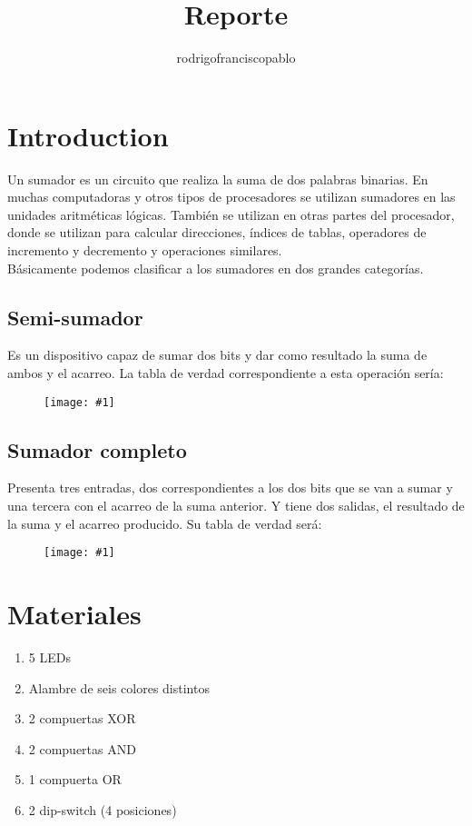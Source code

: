 \documentclass{mylib/reporte}
\title{Reporte}
\author{rodrigofranciscopablo }
\newcommand{\insertImage}[2]{
	\begin{figure}[H]
		\centering
		\texttt{[image: \#1]}
	\end{figure}
}
\begin{document}
\coverPage

\tableofcontents
\newpage

\section{Introduction}

Un sumador es un circuito que realiza la suma de dos palabras binarias.  En muchas computadoras y otros tipos de procesadores se utilizan sumadores en las unidades aritméticas lógicas. También se utilizan en otras partes del procesador, donde se utilizan para calcular direcciones, índices de tablas, operadores de incremento y decremento y operaciones similares.\\

Básicamente podemos clasificar a los sumadores en dos grandes categorías.

\subsection{Semi-sumador}
Es un dispositivo capaz de sumar dos bits y dar como resultado la suma de ambos y el acarreo. La tabla de verdad correspondiente a esta operación sería:

\insertImage{img/dise_proy2/semisum}{6}

\subsection{Sumador completo}

 Presenta tres entradas, dos correspondientes a los dos bits que se van a sumar y una tercera con el acarreo de la suma anterior. Y tiene dos salidas, el resultado de la suma y el acarreo producido. Su tabla de verdad será:

\insertImage{img/dise_proy2/fullsum}{6}

\section{Materiales}

\begin{enumerate}
	\item 5 LEDs
	\item Alambre de seis colores distintos
	\item 2 compuertas XOR
	\item 2 compuertas AND
	\item 1 compuerta OR
	\item 2 dip-switch (4 posiciones)
\end{enumerate}
\end{document}

